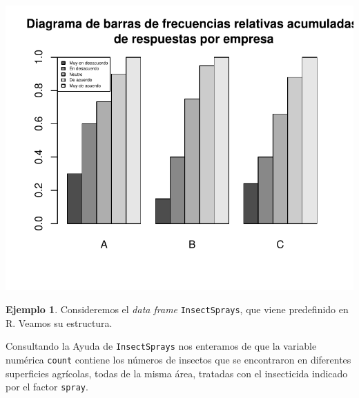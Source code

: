 \documentclass[
]{book}
\newenvironment{Shaded}{\begin{snugshade}}{\end{snugshade}}
\newcommand{\CommentTok}[1]{\textcolor[rgb]{0.56,0.35,0.01}{\textit{#1}}}
\newcommand{\KeywordTok}[1]{\textcolor[rgb]{0.13,0.29,0.53}{\textbf{#1}}}
\newcommand{\NormalTok}[1]{#1}
\theoremstyle{definition}
\theoremstyle{definition}
\newtheorem{example}{Ejemplo}[chapter]
\theoremstyle{definition}
\theoremstyle{remark}
\begin{document}
\begin{center}\includegraphics[width=0.9\linewidth]{11chap11_Descripcion_ordinales_files/figure-latex/unnamed-chunk-28-1} \end{center}

\begin{example}
\protect\hypertarget{exm:sprayord}{}{\label{exm:sprayord} }Consideremos el \emph{data frame} \texttt{InsectSprays}, que viene predefinido en R. Veamos su estructura.
\end{example}

\begin{Shaded}
\end{Shaded}

Consultando la Ayuda de \texttt{InsectSprays} nos enteramos de que la variable numérica \texttt{count} contiene los números de insectos que se encontraron en diferentes superficies agrícolas, todas de la misma área, tratadas con el insecticida indicado por el factor \texttt{spray}.
\end{document}
